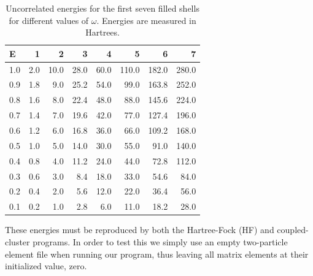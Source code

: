\begin{table}
\begin{center}
\caption{Uncorrelated energies for the first seven filled shells for different values of $\omega$. Energies are measured in Hartrees.}
\label{tab:results:Euncorr}
\begin{tabular}{l|rrrrrrr}
\hline
E     &    1  &   2  &   3    &  4   &  5    &  6    &  7   \\
\hline \hline
1.0   &   2.0 & 10.0 & 28.0   & 60.0 & 110.0 & 182.0 & 280.0 \\
0.9   &   1.8 &  9.0 & 25.2   & 54.0 &  99.0 & 163.8 & 252.0 \\
0.8   &   1.6 &  8.0 & 22.4   & 48.0 &  88.0 & 145.6 & 224.0 \\
0.7   &   1.4 &  7.0 & 19.6   & 42.0 &  77.0 & 127.4 & 196.0 \\
0.6   &   1.2 &  6.0 & 16.8   & 36.0 &  66.0 & 109.2 & 168.0 \\ 
0.5   &   1.0 &  5.0 & 14.0   & 30.0 &  55.0 &  91.0 & 140.0 \\
0.4   &   0.8 &  4.0 & 11.2   & 24.0 &  44.0 &  72.8 & 112.0  \\
0.3   &   0.6 &  3.0 &  8.4   & 18.0 &  33.0 &  54.6 &  84.0  \\
0.2   &   0.4 &  2.0 &  5.6   & 12.0 &  22.0 &  36.4 &  56.0 \\
0.1   &   0.2 &  1.0 &  2.8   &  6.0 &  11.0 &  18.2 &  28.0  \\
\hline \hline
\end{tabular}
\end{center}
\end{table}
These energies must be reproduced by both the Hartree-Fock (HF) and coupled-cluster programs. 
In order to test this we simply use an empty two-particle element file when running our program, thus leaving all matrix elements at their initialized value, zero.


